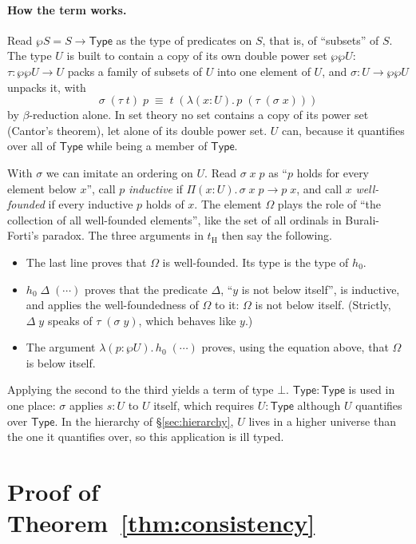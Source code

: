 \documentclass[acmsmall,screen,nonacm]{acmart}
\newcommand{\tPi}[3]{\Pi(#1{:}#2).\,#3}
\newcommand{\tLam}[3]{\lambda(#1{:}#2).\,#3}
\newcommand{\conv}{\equiv}
\begin{document}
\paragraph{How the term works.}
Read $\wp S = S \to \mathsf{Type}$ as the type of predicates on $S$, that is, of ``subsets'' of $S$.
The type $U$ is built to contain a copy of its own double power set $\wp\wp U$:
$\tau : \wp\wp U \to U$ packs a family of subsets of $U$ into one element of $U$, and $\sigma : U \to \wp\wp U$ unpacks it, with
\[
\sigma\;(\tau\;t)\;p \;\conv\; t\;(\tLam{x}{U}{p\;(\tau\;(\sigma\;x))})
\]
by $\beta$-reduction alone.
In set theory no set contains a copy of its power set (Cantor's theorem), let alone of its double power set.
$U$ can, because it quantifies over all of $\mathsf{Type}$ while being a member of $\mathsf{Type}$.

With $\sigma$ we can imitate an ordering on $U$.
Read $\sigma\;x\;p$ as ``$p$ holds for every element below $x$'',
call $p$ \emph{inductive} if $\tPi{x}{U}{\sigma\;x\;p \to p\;x}$, and call $x$ \emph{well-founded} if every inductive $p$ holds of $x$.
The element $\Omega$ plays the role of ``the collection of all well-founded elements'', like the set of all ordinals in Burali-Forti's paradox.
The three arguments in $t_{\mathrm{H}}$ then say the following.
\begin{itemize}
  \item The last line proves that $\Omega$ is well-founded. Its type is the type of $h_0$.
  \item $h_0\;\Delta\;(\cdots)$ proves that the predicate $\Delta$, ``$y$ is not below itself'', is inductive, and applies the well-foundedness of $\Omega$ to it:
    $\Omega$ is not below itself. (Strictly, $\Delta\;y$ speaks of $\tau\;(\sigma\;y)$, which behaves like $y$.)
  \item The argument $\tLam{p}{\wp U}{h_0\;(\cdots)}$ proves, using the equation above, that $\Omega$ is below itself.
\end{itemize}
Applying the second to the third yields a term of type $\bot$.
$\mathsf{Type} : \mathsf{Type}$ is used in one place: $\sigma$ applies $s : U$ to $U$ itself, which requires $U : \mathsf{Type}$ although $U$ quantifies over $\mathsf{Type}$.
In the hierarchy of \S\ref{sec:hierarchy}, $U$ lives in a higher universe than the one it quantifies over, so this application is ill typed.

\section{Proof of Theorem~\ref{thm:consistency}}
\label{app:consistency}
\end{document}
